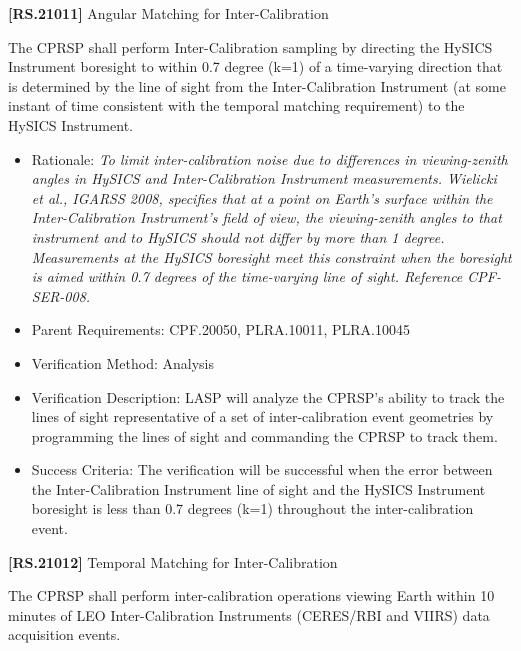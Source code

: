 \textbf{[RS.21011]} Angular Matching for Inter-Calibration

The \gls{CPRSP} shall perform Inter-Calibration sampling by directing the \gls{HySICS} Instrument boresight to within 0.7 degree (k=1) of a time-varying direction that is determined by the line of sight from the Inter-Calibration Instrument (at some instant of time consistent with the temporal matching requirement) to the \gls{HySICS} Instrument.

\begin{itemize}
\item{} Rationale: \emph{To limit inter-calibration noise due to differences in viewing-zenith angles in HySICS and Inter-Calibration Instrument measurements. Wielicki et al., IGARSS 2008, specifies that at a point on Earth's surface within the Inter-Calibration Instrument's field of view, the viewing-zenith angles to that instrument and to HySICS should not differ by more than 1 degree. Measurements at the HySICS boresight meet this constraint when the boresight is aimed within 0.7 degrees of the time-varying line of sight. Reference CPF-SER-008.}

\item{} Parent Requirements: \gls{CPF}.20050, PLRA.10011, PLRA.10045

\item{} Verification Method: Analysis

\item{} Verification Description: \gls{LASP} will analyze the \gls{CPRSP}'s ability to track the lines of sight representative of a set of inter-calibration event geometries by programming the lines of sight and commanding the \gls{CPRSP} to track them.

\item{} Success Criteria: The verification will be successful when the error between the Inter-Calibration Instrument line of sight and the \gls{HySICS} Instrument boresight is less than 0.7 degrees (k=1) throughout the inter-calibration event.

\end{itemize}

\textbf{[RS.21012]} Temporal Matching for Inter-Calibration

The \gls{CPRSP} shall perform inter-calibration operations viewing Earth within 10 minutes of \gls{LEO} Inter-Calibration Instruments (CERES\slash RBI and VIIRS) data acquisition events.

